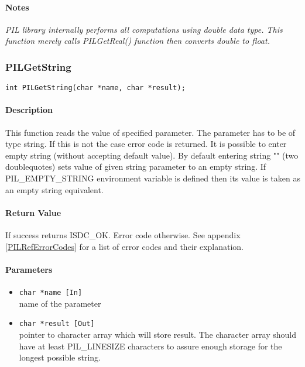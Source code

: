 \paragraph{Notes\\}
{\it
PIL library internally performs all computations using double data type.
This function merely calls PILGetReal() function then converts double to
float.
}



\subsubsection{PILGetString}

\begin{verbatim}
int PILGetString(char *name, char *result);
\end{verbatim}

\paragraph{Description\\}
This function reads the value of specified parameter. The parameter has to
be of type string. If this is not the case error code is returned. 
It is possible to enter empty string (without accepting default value).
By default entering string "" (two doublequotes) sets value of given string
parameter to an empty string. If PIL\_EMPTY\_STRING environment variable
is defined then its value is taken as an empty string equivalent.

\paragraph{Return Value\\}
If success returns ISDC\_OK. Error code otherwise. See appendix \ref{PILRefErrorCodes}
for a list of error codes and their explanation.

\paragraph{Parameters}
\begin{itemize}
\item
{\tt char *name [In] } \\
name of the parameter
\item
{\tt char *result [Out] } \\
pointer to character array which will store result. The character array
should have at least PIL\_LINESIZE characters to assure enough storage for the longest
possible string. 
\end{itemize}


